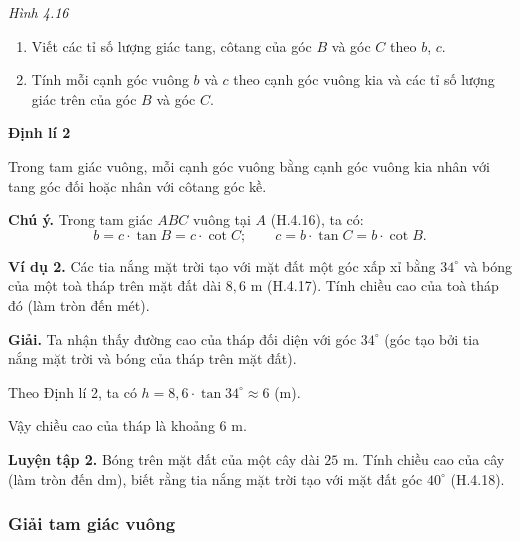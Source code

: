 \begin{lesson}
\begin{center}
        \textit{Hình 4.16}
    \end{center}

    \begin{enumerate}[label=\alph*)]
        \item Viết các tỉ số lượng giác tang, côtang của góc $B$ và góc $C$ theo $b$, $c$.

        \answerline
        \answerline
        \item Tính mỗi cạnh góc vuông $b$ và $c$ theo cạnh góc vuông kia và các tỉ số lượng giác trên của góc $B$ và góc $C$.

        \answerline
        \answerline
    \end{enumerate}

    \textbf{Định lí 2}
    \begin{keyconcept}
        Trong tam giác vuông, mỗi cạnh góc vuông bằng cạnh góc vuông kia nhân với tang góc đối hoặc nhân với côtang góc kề.
    \end{keyconcept}

    \textbf{Chú ý.} Trong tam giác $ABC$ vuông tại $A$ (H.4.16), ta có:
    \[
        b=c\cdot\tan B=c\cdot\cot C;\qquad c=b\cdot\tan C=b\cdot\cot B.
    \]

    \textbf{Ví dụ 2.} Các tia nắng mặt trời tạo với mặt đất một góc xấp xỉ bằng $34^\circ$ và bóng của một toà tháp trên mặt đất dài $8{,}6$ m (H.4.17). Tính chiều cao của toà tháp đó (làm tròn đến mét).


    \textbf{Giải.} Ta nhận thấy đường cao của tháp đối diện với góc $34^\circ$ (góc tạo bởi tia nắng mặt trời và bóng của tháp trên mặt đất).

    Theo Định lí 2, ta có $h=8{,}6\cdot\tan34^\circ\approx 6$ (m).

    Vậy chiều cao của tháp là khoảng $6$ m.

    \textbf{Luyện tập 2.} Bóng trên mặt đất của một cây dài $25$ m. Tính chiều cao của cây (làm tròn đến dm), biết rằng tia nắng mặt trời tạo với mặt đất góc $40^\circ$ (H.4.18).

    \answerline
    \answerline

    \subsubsection{Giải tam giác vuông}


\end{lesson}

